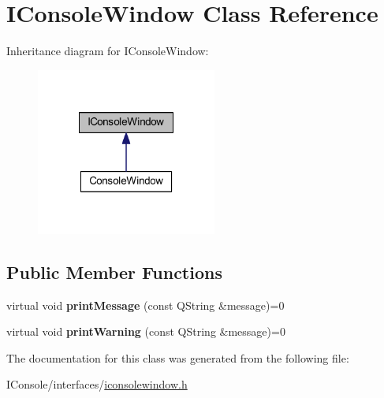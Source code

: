 \hypertarget{class_i_console_window}{\section{I\-Console\-Window Class Reference}
\label{class_i_console_window}
}


Inheritance diagram for I\-Console\-Window\-:
\nopagebreak
\begin{figure}[H]
\begin{center}
\leavevmode
\includegraphics[width=168pt]{class_i_console_window__inherit__graph}
\end{center}
\end{figure}
\subsection*{Public Member Functions}
\begin{DoxyCompactItemize}
\item 
\hypertarget{class_i_console_window_a7fe4cfa09149ac529a44aa87d7d813b3}{virtual void {\bfseries print\-Message} (const Q\-String \&message)=0}\label{class_i_console_window_a7fe4cfa09149ac529a44aa87d7d813b3}

\item 
\hypertarget{class_i_console_window_a64f0fac283cd4f584e6ecc6e4b97fcbd}{virtual void {\bfseries print\-Warning} (const Q\-String \&message)=0}\label{class_i_console_window_a64f0fac283cd4f584e6ecc6e4b97fcbd}

\end{DoxyCompactItemize}


The documentation for this class was generated from the following file\-:\begin{DoxyCompactItemize}
\item 
I\-Console/interfaces/\hyperlink{iconsolewindow_8h}{iconsolewindow.\-h}\end{DoxyCompactItemize}
